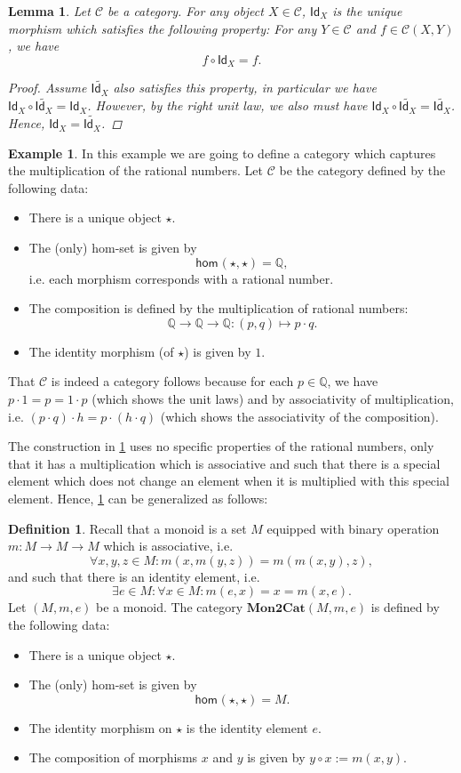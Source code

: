 \documentclass[a4paper,11pt, oneside,titlepage=false]{scrbook}
\theoremstyle{plain}
\newtheorem{lemma}[thm]{Lemma}
\theoremstyle{definition}
\newtheorem{dfn}[thm]{Definition}
\newtheorem{exa}[thm]{Example}
\newcommand{\cfont}[1]{\ensuremath{\mathsf{#1}}}
\newcommand{\Cat}[1]{\mathcal{#1}}
\newcommand{\CC}{\Cat{C}}
\newcommand{\Catb}[1]{\mathbf{#1}}
\newcommand{\MONtoCAT}{\Catb{Mon2Cat}}
\newcommand{\Hom}[3][]{\cfont{hom}_{#1}(#2,#3)}
\newcommand{\CHom}[3]{{#1}(#2,#3)}
\newcommand{\Id}[1][]{\cfont{Id}_{#1}}
\newcommand{\co}[2]{\ensuremath{#2 \circ #1}}
\begin{document}
\begin{lemma}\label{lemma:uniqueid} Let $\CC$ be a category. For any object $X\in\CC$, $\Id[X]$ is the unique morphism which satisfies the following property: For any $Y\in\CC$ and $f\in\CHom \CC X Y$, we have 
\[
\co{\Id[X]} f = f.
\]
\begin{proof}
Assume $\tilde{\Id[X]}$ also satisfies this property, in particular we have $\co {\tilde{\Id[X]}} {\Id[X]} = \Id[X]$. However, by the right unit law, we also must have $\co{\tilde{\Id[X]}}{\Id[X]} = \tilde{\Id[X]}$. Hence, $\Id[X] = \tilde{\Id[X]}$.
\end{proof}
\end{lemma}

\begin{exa}\label{exa:monoidofrationalnumbers} In this example we are going to define a category which captures the multiplication of the rational numbers. Let $\CC$ be the category defined by the following data:
\begin{itemize}
\item There is a unique object $\star$.
\item The (only) hom-set is given by
\[
\Hom{\star}{\star} = \mathbb{Q},
\]
i.e. each morphism corresponds with a rational number.
\item The composition is defined by the multiplication of rational numbers:
\[
\mathbb{Q} \to\mathbb{Q}\to\mathbb{Q} : (p,q)\mapsto p\cdot q.
\]
\item The identity morphism (of $\star$) is given by $1$.
\end{itemize}
That $\CC$ is indeed a category follows because for each $p\in\mathbb{Q}$, we have $p\cdot 1 = p = 1\cdot p$ (which shows the unit laws) and by associativity of multiplication, i.e. $(p\cdot q)\cdot h = p\cdot (h \cdot q)$ (which shows the associativity of the composition).
\end{exa}
The construction in \cref{exa:monoidofrationalnumbers} uses no specific properties of the rational numbers, only that it has a multiplication which is associative and such that there is a special element which does not change an element when it is multiplied with this special element. Hence, \cref{exa:monoidofrationalnumbers} can be generalized as follows:
\begin{dfn}\label{monoidcategory}
Recall that a monoid is a set $M$ equipped with binary operation $m : M \to M \to M$ which is associative, i.e. 
\[
\forall x,y,z\in M: m(x,m(y,z)) = m(m(x,y),z),
\]
and such that there is an identity element, i.e. 
\[
\exists e\in M: \forall x\in M: m(e,x)=x=m(x,e).
\]
Let $(M,m,e)$ be a monoid. The category $\MONtoCAT(M,m,e)$ is defined by the following data:
\begin{itemize}
\item There is a unique object $\star$.
\item The (only) hom-set is given by 
\[
\Hom{\star}{\star} = M.
\]
\item The identity morphism on $\star$ is the identity element $e$.
\item The composition of morphisms $x$ and $y$ is given by $\co{x}{y} := m(x,y)$.
\end{itemize}
\end{dfn}
\end{document}
